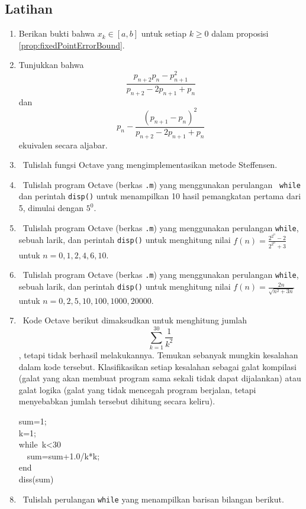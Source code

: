 \subsection{Latihan}
\begin{enumerate}
\item Berikan bukti bahwa $x_{k}\in[a,b]$ untuk setiap $k\geq0$ dalam
proposisi \ref{prop:fixedPointErrorBound}.
\item Tunjukkan bahwa 
\[
{\displaystyle \frac{p_{n+2}p_{n}-p_{n+1}^{2}}{p_{n+2}-2p_{n+1}+p_{n}}}
\]
dan 
\[
{\displaystyle p_{n}-\frac{(p_{n+1}-p_{n})^{2}}{p_{n+2}-2p_{n+1}+p_{n}}}
\]
ekuivalen secara aljabar.
\item \octave\ Tulislah fungsi Octave yang mengimplementasikan metode Steffensen.
\item \octave\ Tulislah program Octave (berkas \texttt{.m}) yang menggunakan
perulangan \texttt{ while} dan perintah \texttt{disp()} untuk menampilkan
10 hasil pemangkatan pertama dari 5, dimulai dengan $5^{0}$.
\item \label{exc:orderOfConvergence}\octave\ Tulislah program Octave (berkas
\texttt{.m}) yang menggunakan perulangan \texttt{while}, sebuah larik,
dan perintah \texttt{disp()} untuk menghitung nilai ${\displaystyle f(n)=\frac{2^{2^{n}}-2}{2^{2^{n}}+3}}$
untuk $n=0,1,2,4,6,10$. \hasasolution 
\item \octave\ Tulislah program Octave (berkas \texttt{.m}) yang menggunakan
perulangan \texttt{while}, sebuah larik, dan perintah \texttt{disp()}
untuk menghitung nilai ${\displaystyle f(n)=\frac{2n}{\sqrt{n^{2}+3n}}}$
untuk $n=0,2,5,10,100,1000,20000$.
\item \octave\ Kode Octave berikut dimaksudkan untuk menghitung jumlah
\[
\sum_{k=1}^{30}\frac{1}{k^{2}}
\]
, tetapi tidak berhasil melakukannya. Temukan sebanyak mungkin kesalahan
dalam kode tersebut. Klasifikasikan setiap kesalahan sebagai galat
kompilasi (galat yang akan membuat program sama sekali tidak dapat
dijalankan) atau galat logika (galat yang tidak mencegah program berjalan,
tetapi menyebabkan jumlah tersebut dihitung secara keliru).

\begin{lyxcode}
sum=1;~\\
k=1;~\\
while~k<30~\\
~~sum=sum+1.0/k{*}k;~\\
end~\\
diss(sum)
\end{lyxcode}
\item \octave\ Tulislah perulangan \texttt{while} yang menampilkan barisan
bilangan berikut.


\end{enumerate}
